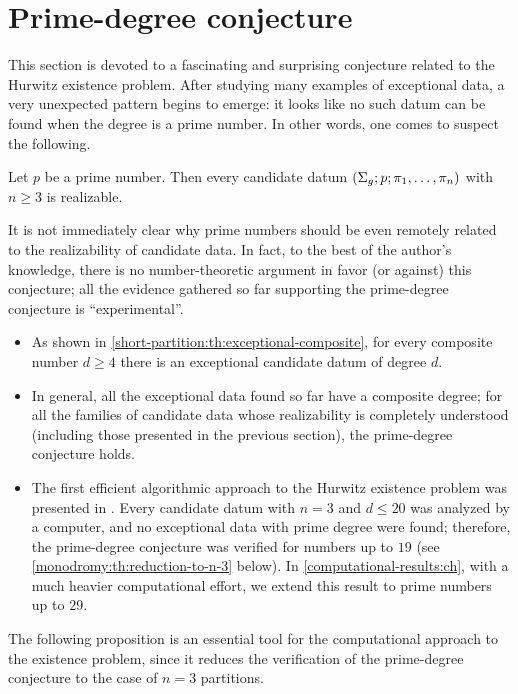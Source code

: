 \section{Prime-degree conjecture}

This section is devoted to a fascinating and surprising conjecture related to the Hurwitz existence problem. After studying many examples of exceptional data, a very unexpected pattern begins to emerge: it looks like no such datum can be found when the degree is a prime number. In other words, one comes to suspect the following.

\begin{prime-degree-conjecture*}\label{prime-degree-conjecture}
Let $p$ be a prime number. Then every candidate datum $(\Sigma_{g};p;\pi_1,\ldots,\pi_n)$ with $n\ge 3$ is realizable.
\end{prime-degree-conjecture*}

It is not immediately clear why prime numbers should be even remotely related to the realizability of candidate data. In fact, to the best of the author's knowledge, there is no number-theoretic argument in favor (or against) this conjecture; all the evidence gathered so far supporting the prime-degree conjecture is ``experimental''.
\begin{itemize}
\item As shown in \cref{short-partition:th:exceptional-composite}, for every composite number $d\ge 4$ there is an exceptional candidate datum of degree $d$.
\item In general, all the exceptional data found so far have a composite degree; for all the families of candidate data whose realizability is completely understood (including those presented in the previous section), the prime-degree conjecture holds.
\item The first efficient algorithmic approach to the Hurwitz existence problem was presented in \cite{zheng}. Every candidate datum with $n=3$ and $d\le 20$ was analyzed by a computer, and no exceptional data with prime degree were found; therefore, the prime-degree conjecture was verified for numbers up to $19$ (see \cref{monodromy:th:reduction-to-n-3} below). In \cref{computational-results:ch}, with a much heavier computational effort, we extend this result to prime numbers up to $29$.
\end{itemize}

The following proposition is an essential tool for the computational approach to the existence problem, since it reduces the verification of the prime-degree conjecture to the case of $n=3$ partitions.


